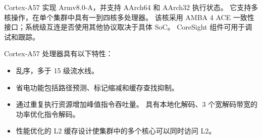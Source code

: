 Cortex-A57 实现 Armv8.0-A，并支持 AArch64 和 AArch32 执行状态。
它支持多核操作，在单个集群中具有一到四核多处理器。
该核采用 AMBA 4 ACE 一致性接口；系统级互连是否使用其他协议取决于具体 SoC。
CoreSight 组件可用于调试和跟踪。

Cortex‑A57 处理器具有以下特性：

\begin{itemize}
  \item 乱序，多于 15 级流水线。
  \item 省电功能包括路径预测、标记缩减和缓存查找抑制。
  \item 通过重复执行资源增加峰值指令吞吐量。
    具有本地化解码、3 个宽解码带宽的功率优化指令解码。
  \item 性能优化的 L2 缓存设计使集群中的多个核心可以同时访问 L2。
\end{itemize}
